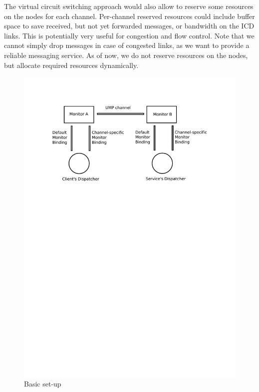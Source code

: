 \documentclass[a4paper,twoside]{report} %
\begin{document}
The virtual circuit switching approach would also allow to reserve some resources on the nodes for each channel. Per-channel reserved resources could include buffer space to save received, but not yet forwarded messages, or bandwidth on the ICD links. This is potentially very useful for congestion and flow control. Note that we cannot simply drop messages in case of congested links, as we want to provide a reliable messaging service. As of now, we do not reserve resources on the nodes, but allocate required resources dynamically.

\begin{figure}[h]
	\begin{center}
 	\includegraphics[scale=0.7]{overview_multihop_channel.pdf}
 	\caption{Basic set-up}\label{fig:multihop-chan}
 	\end{center}
\end{figure}
\end{document}
